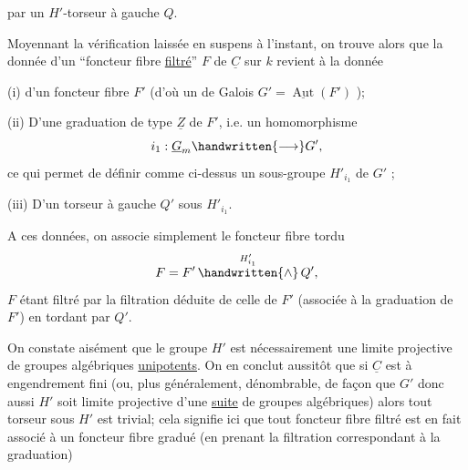 %
par un $H'$-torseur à gauche $Q$.

Moyennant la vérification laissée en suspens à l'instant, on trouve alors que la donnée d'un ``foncteur fibre \uline{filtré}'' $F$ de $\underline{C}$ sur $k$ revient à la donnée

(i) d'un foncteur fibre $F'$  (d'où un  de Galois $G'=\underline{\operatorname{Aut}}(F')$ );

(ii) D'une graduation de type $\underline{Z}$ de $F'$, i.e. un homomorphisme
\[
i_1:\underline{G}_m\handwritten{\longrightarrow}G',
\]
ce qui permet de définir comme ci-dessus un sous-groupe $H'_{i_1}$ de $G'$ ;

(iii) D'un torseur à gauche $Q'$ sous $H'_{i_1}$.

A ces données, on associe simplement le foncteur fibre tordu
\[
F=F'\mathop{\handwritten{\wedge}}\limits^{H'_{i_1}}Q',
\]
$F$ étant filtré par la filtration déduite de celle de $F'$  (associée à la graduation de $F'$) en tordant par $Q'$.


On constate aisément que le groupe $H'$ est nécessairement une limite projective de groupes algébriques \uline{unipotents}. On en conclut aussitôt que si $\underline{C}$ est à engendrement fini (ou, plus généralement,  dénombrable, de façon que $G'$  donc aussi $H'$ soit limite projective d'une \uline{suite} de groupes algébriques) alors tout torseur sous $H'$ est trivial; cela signifie ici que tout foncteur fibre filtré est en fait associé à un foncteur fibre gradué (en prenant la filtration correspondant à la graduation)

